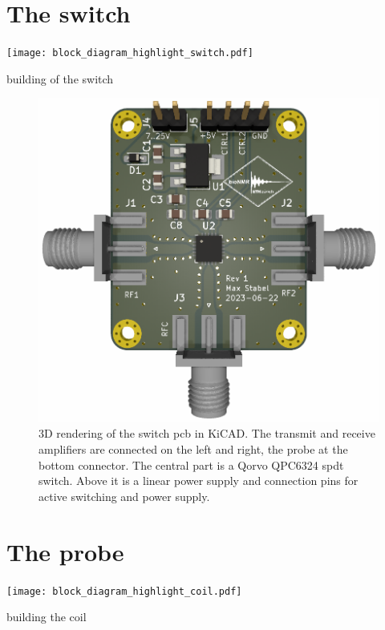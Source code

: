 \section{The switch}
\begin{marginfigure}[-4.5\baselineskip]
    \texttt{[image: block\_diagram\_highlight\_switch.pdf]}
\end{marginfigure}
building of the switch

\begin{figure}[hbt]
    \centering
    \includegraphics{images/tr_switch.png}
    \caption{ 3D rendering of the switch \acrshort{pcb} in KiCAD. The transmit and receive amplifiers are connected on the left and right, the probe at the bottom connector. The central part is a Qorvo QPC6324 \acrfull{spdt} switch. Above it is a linear power supply and connection pins for active switching and power supply.}
\end{figure}


\section{The probe}
\begin{marginfigure}[-4.5\baselineskip]
    \texttt{[image: block\_diagram\_highlight\_coil.pdf]}
\end{marginfigure}
building the coil

